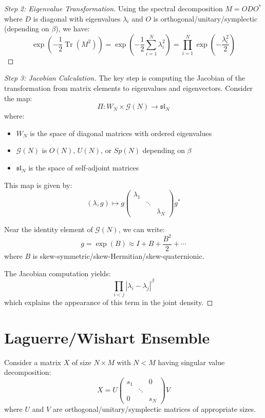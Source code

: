 \documentclass[letterpaper,11pt,oneside,reqno]{article}
\numberwithin{equation}{section}
\theoremstyle{definition}
\begin{document}
\begin{proof}[Step 2: Eigenvalue Transformation]
Using the spectral decomposition $M = ODO^*$ where $D$ is diagonal with eigenvalues $\lambda_i$ and $O$ is orthogonal/unitary/symplectic (depending on $\beta$), we have:
\[ \exp\left(-\frac{1}{2}\operatorname{Tr}(M^2)\right) = \exp\left(-\frac{1}{2}\sum_{i=1}^N \lambda_i^2\right) = \prod_{i=1}^N \exp\left(-\frac{\lambda_i^2}{2}\right) \]
\end{proof}


\begin{proof}[Step 3: Jacobian Calculation]
The key step is computing the Jacobian of the transformation from matrix elements to eigenvalues and eigenvectors. Consider the map:
\[ \Pi: W_N \times \mathcal{G}(N) \to \mathfrak{sl}_N \]
where:
\begin{itemize}
\item $W_N$ is the space of diagonal matrices with ordered eigenvalues
\item $\mathcal{G}(N)$ is $O(N)$, $U(N)$, or $Sp(N)$ depending on $\beta$
\item $\mathfrak{sl}_N$ is the space of self-adjoint matrices
\end{itemize}

This map is given by:
\[ (\lambda, g) \mapsto g\begin{pmatrix}\lambda_1 & & \\ & \ddots & \\ & & \lambda_N\end{pmatrix}g^* \]

Near the identity element of $\mathcal{G}(N)$, we can write:
\[ g = \exp(B) \approx I + B + \frac{B^2}{2} + \cdots \]
where $B$ is skew-symmetric/skew-Hermitian/skew-quaternionic.

The Jacobian computation yields:
\[ \prod_{i<j} |\lambda_i-\lambda_j|^\beta \]
which explains the appearance of this term in the joint density.
\end{proof}

\section{Laguerre/Wishart Ensemble}

Consider a matrix $X$ of size $N \times M$ with $N < M$ having singular value decomposition:
\[ X = U\begin{pmatrix}s_1 & & 0 \\ & \ddots & \\ 0 & & s_N\end{pmatrix}V \]
where $U$ and $V$ are orthogonal/unitary/symplectic matrices of appropriate sizes.
\end{document}
